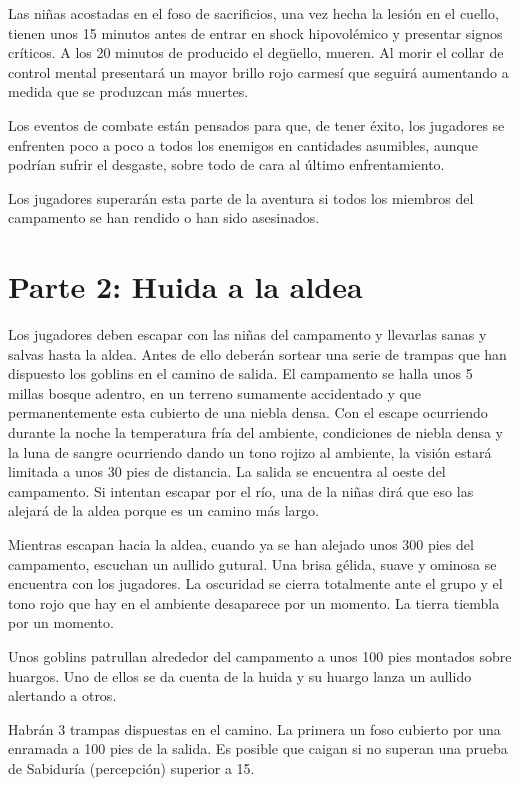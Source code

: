 \documentclass[10pt,twoside,twocolumn,openany]{dndbook}
\begin{document}
Las niñas acostadas en el foso de sacrificios, una vez hecha la lesión en el cuello, tienen unos 
15 minutos antes de entrar en shock hipovolémico y presentar signos críticos. A los 20 minutos de 
producido el degüello, mueren. Al morir el collar de control mental presentará un mayor brillo
rojo carmesí que seguirá aumentando a medida que se produzcan más muertes.

Los eventos de combate están pensados para que, de tener éxito, los jugadores se enfrenten poco a 
poco a todos los enemigos en cantidades asumibles, aunque podrían sufrir el desgaste, sobre todo 
de cara al último enfrentamiento.

Los jugadores superarán esta parte de la aventura si todos los miembros del campamento se han 
rendido o han sido asesinados. 


\section{Parte 2: Huida a la aldea}

Los jugadores deben escapar con las niñas del campamento y llevarlas sanas y salvas hasta la aldea. 
Antes de ello deberán sortear una serie de trampas que han dispuesto los goblins en el camino de salida. 
El campamento se halla unos 5 millas bosque adentro, en un terreno sumamente accidentado y que 
permanentemente esta cubierto de una niebla densa. Con el escape ocurriendo durante la noche 
la temperatura fría del ambiente, condiciones de niebla densa y la luna de sangre ocurriendo dando 
un tono rojizo al ambiente, la visión estará limitada a unos 30 pies de distancia. La salida se 
encuentra al oeste del campamento. Si intentan escapar por el río, una de la niñas dirá que eso 
las alejará de la aldea porque es un camino más largo.

\begin{DndReadAloud}
Mientras escapan hacia la aldea, cuando ya se han alejado unos 300 pies del campamento, escuchan 
un aullido gutural. Una brisa gélida, suave y ominosa se encuentra con los jugadores. La oscuridad
se cierra totalmente ante el grupo y el tono rojo que hay en el ambiente desaparece por un momento.
La tierra tiembla por un momento.
\end{DndReadAloud}

Unos goblins patrullan alrededor del campamento a unos 100 pies montados sobre huargos. Uno de 
ellos se da cuenta de la huida y su huargo lanza un aullido alertando a otros.

Habrán 3 trampas dispuestas en el camino. La primera un foso cubierto por una enramada a 100 pies de 
la salida. Es posible que caigan si no superan una prueba de Sabiduría (percepción) superior a 15.
\end{document}

